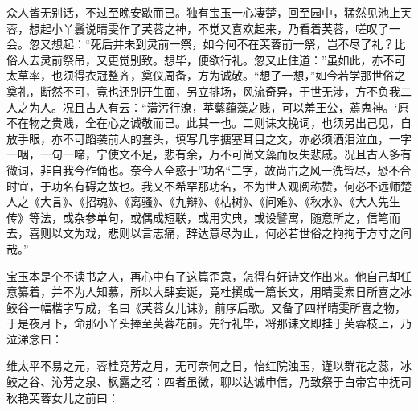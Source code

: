 \documentclass[12pt,oneside]{book}
\begin{document}
众人皆无别话，不过至晚安歇而已。独有宝玉一心凄楚，回至园中，猛然见池上芙蓉，想起小丫鬟说晴雯作了芙蓉之神，不觉又喜欢起来，乃看着芙蓉，嗟叹了一会。忽又想起：“死后并未到灵前一祭，如今何不在芙蓉前一祭，岂不尽了礼？比俗人去灵前祭吊，又更觉别致。想毕，便欲行礼。忽又止住道：”虽如此，亦不可太草率，也须得衣冠整齐，奠仪周备，方为诚敬。“想了一想，”如今若学那世俗之奠礼，断然不可，竟也还别开生面，另立排场，风流奇异，于世无涉，方不负我二人之为人。况且古人有云：“潢污行潦，苹蘩蕴藻之贱，可以羞王公，蔫鬼神。‘原不在物之贵贱，全在心之诚敬而已。此其一也。二则诔文挽词，也须另出己见，自放手眼，亦不可蹈袭前人的套头，填写几字搪塞耳目之文，亦必须洒泪泣血，一字一咽，一句一啼，宁使文不足，悲有余，万不可尚文藻而反失悲戚。况且古人多有微词，非自我今作俑也。奈今人全惑于”功名“二字，故尚古之风一洗皆尽，恐不合时宜，于功名有碍之故也。我又不希罕那功名，不为世人观阅称赞，何必不远师楚人之《大言》、《招魂》、《离骚》、《九辩》、《枯树》、《问难》、《秋水》、《大人先生传》等法，或杂参单句，或偶成短联，或用实典，或设譬寓，随意所之，信笔而去，喜则以文为戏，悲则以言志痛，辞达意尽为止，何必若世俗之拘拘于方寸之间哉。”

宝玉本是个不读书之人，再心中有了这篇歪意，怎得有好诗文作出来。他自己却任意纂着，并不为人知慕，所以大肆妄诞，竟杜撰成一篇长文，用晴雯素日所喜之冰鲛谷一幅楷字写成，名曰《芙蓉女儿诔》，前序后歌。又备了四样晴雯所喜之物，于是夜月下，命那小丫头捧至芙蓉花前。先行礼毕，将那诔文即挂于芙蓉枝上，乃泣涕念曰：

维太平不易之元，蓉桂竞芳之月，无可奈何之日，怡红院浊玉，谨以群花之蕊，冰鲛之谷、沁芳之泉、枫露之茗：四者虽微，聊以达诚申信，乃致祭于白帝宫中抚司秋艳芙蓉女儿之前曰：
\end{document}
